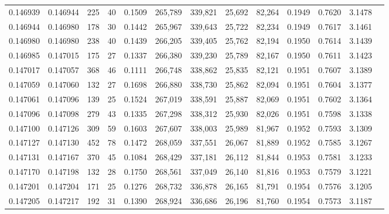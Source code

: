 \begin{tabular}{rrrrrrrrrrrrr}
0.146939 & 0.146944 &   225 &  40 &                                     0.1509 & 265,789 & 339,821 &  25,692 &  82,264 & 0.1949 & 0.7620 & 3.1478 \\
0.146944 & 0.146980 &   178 &  30 &                                     0.1442 & 265,967 & 339,643 &  25,722 &  82,234 & 0.1949 & 0.7617 & 3.1461 \\
0.146980 & 0.146980 &   238 &  40 &                                     0.1439 & 266,205 & 339,405 &  25,762 &  82,194 & 0.1950 & 0.7614 & 3.1439 \\
0.146985 & 0.147015 &   175 &  27 &                                     0.1337 & 266,380 & 339,230 &  25,789 &  82,167 & 0.1950 & 0.7611 & 3.1423 \\
0.147017 & 0.147057 &   368 &  46 &                                     0.1111 & 266,748 & 338,862 &  25,835 &  82,121 & 0.1951 & 0.7607 & 3.1389 \\
0.147059 & 0.147060 &   132 &  27 &                                     0.1698 & 266,880 & 338,730 &  25,862 &  82,094 & 0.1951 & 0.7604 & 3.1377 \\
0.147061 & 0.147096 &   139 &  25 &                                     0.1524 & 267,019 & 338,591 &  25,887 &  82,069 & 0.1951 & 0.7602 & 3.1364 \\
0.147096 & 0.147098 &   279 &  43 &                                     0.1335 & 267,298 & 338,312 &  25,930 &  82,026 & 0.1951 & 0.7598 & 3.1338 \\
0.147100 & 0.147126 &   309 &  59 &                                     0.1603 & 267,607 & 338,003 &  25,989 &  81,967 & 0.1952 & 0.7593 & 3.1309 \\
0.147127 & 0.147130 &   452 &  78 &                                     0.1472 & 268,059 & 337,551 &  26,067 &  81,889 & 0.1952 & 0.7585 & 3.1267 \\
0.147131 & 0.147167 &   370 &  45 &                                     0.1084 & 268,429 & 337,181 &  26,112 &  81,844 & 0.1953 & 0.7581 & 3.1233 \\
0.147170 & 0.147198 &   132 &  28 &                                     0.1750 & 268,561 & 337,049 &  26,140 &  81,816 & 0.1953 & 0.7579 & 3.1221 \\
0.147201 & 0.147204 &   171 &  25 &                                     0.1276 & 268,732 & 336,878 &  26,165 &  81,791 & 0.1954 & 0.7576 & 3.1205 \\
0.147205 & 0.147217 &   192 &  31 &                                     0.1390 & 268,924 & 336,686 &  26,196 &  81,760 & 0.1954 & 0.7573 & 3.1187 \\

\end{tabular}
